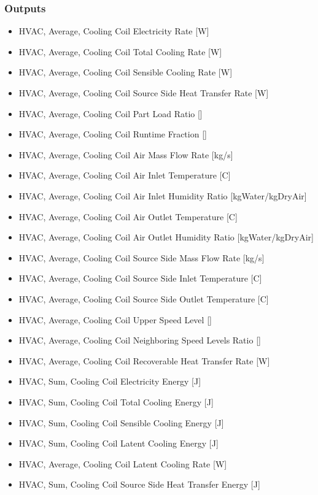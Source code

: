 \subsubsection{Outputs}\label{outputs-26}

\begin{itemize}
\item
  HVAC, Average, Cooling Coil Electricity Rate {[}W{]}
\item
  HVAC, Average, Cooling Coil Total Cooling Rate {[}W{]}
\item
  HVAC, Average, Cooling Coil Sensible Cooling Rate {[}W{]}
\item
  HVAC, Average, Cooling Coil Source Side Heat Transfer Rate {[}W{]}
\item
  HVAC, Average, Cooling Coil Part Load Ratio {[]}
\item
  HVAC, Average, Cooling Coil Runtime Fraction {[]}
\item
  HVAC, Average, Cooling Coil Air Mass Flow Rate {[}kg/s{]}
\item
  HVAC, Average, Cooling Coil Air Inlet Temperature {[}C{]}
\item
  HVAC, Average, Cooling Coil Air Inlet Humidity Ratio {[}kgWater/kgDryAir{]}
\item
  HVAC, Average, Cooling Coil Air Outlet Temperature {[}C{]}
\item
  HVAC, Average, Cooling Coil Air Outlet Humidity Ratio {[}kgWater/kgDryAir{]}
\item
  HVAC, Average, Cooling Coil Source Side Mass Flow Rate {[}kg/s{]}
\item
  HVAC, Average, Cooling Coil Source Side Inlet Temperature {[}C{]}
\item
  HVAC, Average, Cooling Coil Source Side Outlet Temperature {[}C{]}
\item
  HVAC, Average, Cooling Coil Upper Speed Level {[]}
\item
  HVAC, Average, Cooling Coil Neighboring Speed Levels Ratio {[]}
\item
  HVAC, Average, Cooling Coil Recoverable Heat Transfer Rate {[}W{]}
\item
  HVAC, Sum, Cooling Coil Electricity Energy {[}J{]}
\item
  HVAC, Sum, Cooling Coil Total Cooling Energy {[}J{]}
\item
  HVAC, Sum, Cooling Coil Sensible Cooling Energy {[}J{]}
\item
  HVAC, Sum, Cooling Coil Latent Cooling Energy {[}J{]}
\item
  HVAC, Average, Cooling Coil Latent Cooling Rate {[}W{]}
\item
  HVAC, Sum, Cooling Coil Source Side Heat Transfer Energy {[}J{]}
\end{itemize}

